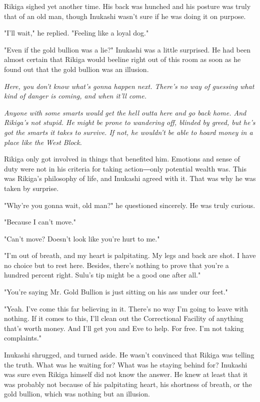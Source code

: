 Rikiga sighed yet another time. His back was hunched and his posture was
truly that of an old man, though Inukashi wasn't sure if he was doing it
on purpose.

"I'll wait," he replied. "Feeling like a loyal dog."

"Even if the gold bullion was a lie?" Inukashi was a little surprised.
He had been almost certain that Rikiga would beeline right out of this
room as soon as he found out that the gold bullion was an illusion.

\emph{Here, you don't know what's gonna happen next. There's no way of
	guessing what kind of danger is coming, and when it'll come.}

\emph{Anyone with some smarts would get the hell outta here and go back home.
	And Rikiga's not stupid. He might be prone to wandering off, blinded by
	greed, but he's got the smarts it takes to survive. If not, he wouldn't
	be able to hoard money in a place like the West Block.}

Rikiga only got involved in things that benefited him. Emotions and
sense of duty were not in his criteria for taking action―only potential
wealth was. This was Rikiga's philosophy of life, and Inukashi agreed
with it. That was why he was taken by surprise.

"Why're you gonna wait, old man?" he questioned sincerely. He was truly
curious.

"Because I can't move."

"Can't move? Doesn't look like you're hurt to me."

"I'm out of breath, and my heart is palpitating. My legs and back are
shot. I have no choice but to rest here. Besides, there's nothing to
prove that you're a hundred percent right. Sulu's tip might be a good
one after all."

"You're saying Mr. Gold Bullion is just sitting on his ass under our
feet."

"Yeah. I've come this far believing in it. There's no way I'm going to
leave with nothing. If it comes to this, I'll clean out the Correctional
Facility of anything that's worth money. And I'll get you and Eve to
help. For free. I'm not taking complaints."

Inukashi shrugged, and turned aside. He wasn't convinced that Rikiga was
telling the truth. What was he waiting for? What was he staying behind
for? Inukashi was sure even Rikiga himself did not know the answer. He
knew at least that it was probably not because of his palpitating heart,
his shortness of breath, or the gold bullion, which was nothing but an
illusion.

